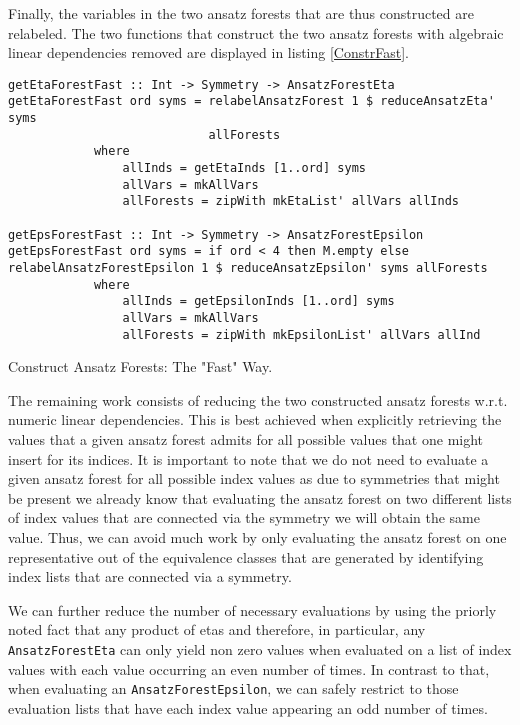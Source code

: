 Finally, the variables in the two ansatz forests that are thus constructed are relabeled. The two functions that construct the two ansatz forests with algebraic linear dependencies removed are displayed in listing \ref{ConstrFast}.
\begin{listing}[hbt!]
\begin{verbatim}
getEtaForestFast :: Int -> Symmetry -> AnsatzForestEta
getEtaForestFast ord syms = relabelAnsatzForest 1 $ reduceAnsatzEta' syms 
                            allForests
            where
                allInds = getEtaInds [1..ord] syms
                allVars = mkAllVars
                allForests = zipWith mkEtaList' allVars allInds

getEpsForestFast :: Int -> Symmetry -> AnsatzForestEpsilon
getEpsForestFast ord syms = if ord < 4 then M.empty else
relabelAnsatzForestEpsilon 1 $ reduceAnsatzEpsilon' syms allForests
            where
                allInds = getEpsilonInds [1..ord] syms
                allVars = mkAllVars
                allForests = zipWith mkEpsilonList' allVars allInd
\end{verbatim} 
\caption{Construct Ansatz Forests: The "Fast" Way.}\label{ConstrFast}
\end{listing}

The remaining work consists of reducing the two constructed ansatz forests w.r.t. numeric linear dependencies. This is best achieved when explicitly retrieving the values that a given ansatz forest admits for all possible values that one might insert for its indices. It is important to note that we do not need to evaluate a given ansatz forest for all possible index values as due to symmetries that might be present we already know that evaluating the ansatz forest on two different lists of index values that are connected via the symmetry we will obtain the same value. Thus, we can avoid much work by only evaluating the ansatz forest on one representative out of the equivalence classes that are generated by identifying index lists that are connected via a symmetry. 

We can further reduce the number of necessary evaluations by using the priorly noted fact that any product of etas and therefore, in particular, any \texttt{AnsatzForestEta} can only yield non zero values when evaluated on a list of index values with each value occurring an even number of times. In contrast to that, when evaluating an \texttt{AnsatzForestEpsilon}, we can safely restrict to those evaluation lists that have each index value appearing an odd number of times.

